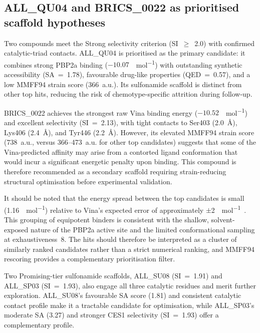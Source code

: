 \documentclass[12pt]{article}
\begin{document}
\subsection{ALL\_QU04 and BRICS\_0022 as prioritised scaffold hypotheses}
Two compounds meet the Strong selectivity criterion (SI~$\ge$~2.0) with confirmed catalytic-triad contacts. ALL\_QU04 is prioritised as the primary candidate: it combines strong PBP2a binding ($-10.07$~\si{\kcal\per\mol}) with outstanding synthetic accessibility (SA~=~1.78), favourable drug-like properties (QED~=~0.57), and a low MMFF94 strain score (366~a.u.). Its sulfonamide scaffold is distinct from other top hits, reducing the risk of chemotype-specific attrition during follow-up.

BRICS\_0022 achieves the strongest raw Vina binding energy ($-10.52$~\si{\kcal\per\mol}) and excellent selectivity (SI~=~2.13), with tight contacts to Ser403 (\SI{2.0}{\angstrom}), Lys406 (\SI{2.4}{\angstrom}), and Tyr446 (\SI{2.2}{\angstrom}). However, its elevated MMFF94 strain score (738~a.u., versus 366--473~a.u. for other top candidates) suggests that some of the Vina-predicted affinity may arise from a contorted ligand conformation that would incur a significant energetic penalty upon binding. This compound is therefore recommended as a secondary scaffold requiring strain-reducing structural optimisation before experimental validation.

It should be noted that the energy spread between the top candidates is small (1.16~\si{\kcal\per\mol}) relative to Vina's expected error of approximately $\pm$\SI{2}{\kcal\per\mol}~\cite{trott2010}. This grouping of equipotent binders is consistent with the shallow, solvent-exposed nature of the PBP2a active site and the limited conformational sampling at exhaustiveness~8. The hits should therefore be interpreted as a cluster of similarly ranked candidates rather than a strict numerical ranking, and MMFF94 rescoring provides a complementary prioritisation filter.

Two Promising-tier sulfonamide scaffolds, ALL\_SU08 (SI~=~1.91) and ALL\_SP03 (SI~=~1.93), also engage all three catalytic residues and merit further exploration. ALL\_SU08's favourable SA score (1.81) and consistent catalytic contact profile make it a tractable candidate for optimisation, while ALL\_SP03's moderate SA (3.27) and stronger CES1 selectivity (SI~=~1.93) offer a complementary profile.
\end{document}
